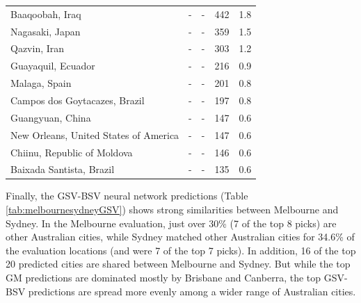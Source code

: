 \documentclass[10pt,letterpaper,hidelinks]{article}
\begin{document}
\begin{table}[!htbp]
\begin{adjustwidth}{-2.25in}{0in}
\begin{tabular}{ l  l l l  l}
Baaqoobah, Iraq &-&- & 442 & 1.8\\ 
Nagasaki, Japan &-&- & 359 & 1.5\\ 
Qazvin, Iran &-&- & 303 & 1.2\\ 
Guayaquil, Ecuador &-&- & 216 & 0.9\\ 
Malaga, Spain &-&- & 201 & 0.8\\ 
Campos dos Goytacazes, Brazil &-&- & 197 & 0.8\\ 
Guangyuan, China &-&- & 147 & 0.6\\ 
New Orleans, United States of America &-&- & 147 & 0.6\\ 
Chiinu, Republic of Moldova &-&- & 146 & 0.6\\ 
Baixada Santista, Brazil &-&- & 135 & 0.6\\ \hline
\end{tabular}
\end{adjustwidth}
\end{table}


Finally, the GSV-BSV neural network predictions (Table \ref{tab:melbournesydneyGSV}) shows strong similarities between Melbourne and Sydney. In the Melbourne evaluation, just over 30\% (7 of the top 8 picks) are other Australian cities, while Sydney matched other Australian cities for 34.6\% of the evaluation locations (and were 7 of the top 7 picks). In addition, 16 of the top 20 predicted cities are shared between Melbourne and Sydney. But while the top GM predictions are dominated mostly by Brisbane and Canberra, the top GSV-BSV predictions are spread more evenly among a wider range of Australian cities.
\end{document}
